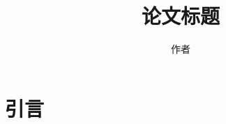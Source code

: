 \documentclass[UTF8,zihao=-4]{ctexart}
\title{论文标题}
\author{作者}
\begin{document}
\maketitle
\begin{abstract}
\end{abstract}
\section{引言}\label{sec:intro}


\end{document}
